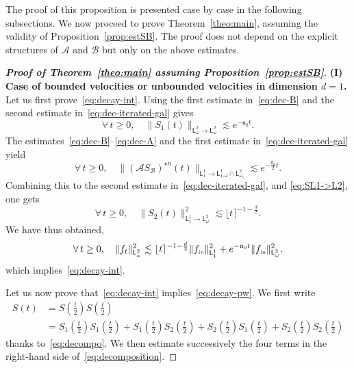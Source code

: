 \documentclass[11pt]{amsart}
\theoremstyle{definition}
\theoremstyle{remark}
\numberwithin{equation}{section}
\def\AA{{\mathcal A}}
\def\BB{{\mathcal B}}
\newcommand{\init}{\text{{\tiny {\rm in}}}}
\newcommand{\sfL}{\mathsf{L}}
\newcommand{\wangle}[1]{\lfloor #1 \rceil}
\begin{document}
The proof of this proposition is presented case by case in the following subsections. We now proceed to prove Theorem~\ref{theo:main}, assuming the validity of Proposition~\ref{prop:estSB}. The proof does not depend on the explicit structures of $\mathcal{A}$ and $\mathcal{B}$ but only on the above estimates.

\begin{proof}[{\bf Proof of Theorem~\ref{theo:main} assuming Proposition~\ref{prop:estSB}}]
  \text{ } \medskip
  
  \noindent
  {\bf (I) Case of bounded velocities or unbounded velocities in dimension $d=1$.} Let us first prove~\eqref{eq:decay-int}. Using the first estimate in~\eqref{eq:dec-B} and the second estimate in~\eqref{eq:dec-iterated-gal} gives 
  \begin{equation*}
    \forall \, t \ge 0, \quad \big\| S_1 (t) \big\|_{\sfL^{2}_\omega \to \sfL^{2}_\omega} \lesssim e^{- \mathfrak{a}_0 t}.
  \end{equation*}
  The estimates~\eqref{eq:dec-B}--\eqref{eq:dec-A} and the first estimate in~\eqref{eq:dec-iterated-gal} yield
  \begin{equation*}
    \forall \, t \ge 0, \quad \big\| (\AA S_\BB)^{\star n} (t) \big\|_{\sfL^{1}_{1} \to \sfL^{1}_{1,\omega} \cap \sfL^{2}_{\omega_1}} \lesssim e^{-\frac{\mathfrak{a}_0}{2}t}.
  \end{equation*}
  Combining this to the second estimate in~\eqref{eq:dec-iterated-gal}, and \eqref{eq:SL1->L2}, one gets
  \begin{equation*}
    \forall \, t \ge 0, \quad \big\| S_2 (t) \big\|_{\sfL^{1}_{1} \to \sfL^{2}_\omega}^2 \lesssim \wangle{t}^{-1-\frac{d}2}.
  \end{equation*}
  We have thus obtained, 
  \begin{equation*}
    \forall \, t \ge 0, \quad \| f_t \|_{\sfL^{2}_\omega}^2 \lesssim \wangle{t}^{-1-\frac{d}2} \| f_{\init} \|_{\sfL^{1}_{1}}^2 + e^{-\mathfrak a_0 t} \|  f_{\init} \|_{\sfL^{2}_\omega}^2.
  \end{equation*}
  which implies~\eqref{eq:decay-int}.
  \smallskip
  
  Let us now prove that~\eqref{eq:decay-int} implies~\eqref{eq:decay-pw}. We first write
  \begin{align}
    \nonumber
    S (t) & = S\left(\tfrac{t}{2}\right) S\left(\tfrac{t}{2}\right)  \\
    \label{eq:decomposition}
          & =  S_1\left(\tfrac{t}{2}\right) S_1\left(\tfrac{t}{2}\right) +  S_1\left(\tfrac{t}{2}\right) S_2\left(\tfrac{t}{2}\right) +  S_2\left(\tfrac{t}{2}\right) S_1\left(\tfrac{t}{2}\right) +  S_2\left(\tfrac{t}{2}\right) S_2\left(\tfrac{t}{2}\right)
  \end{align}
  thanks to~\eqref{eq:decompo}. We then estimate successively the four terms in the right-hand side of~\eqref{eq:decomposition}.
  

\end{proof}
\end{document}
